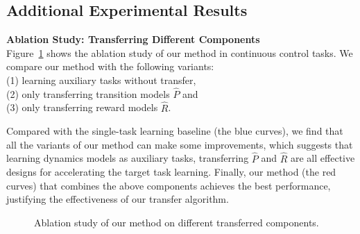 \newpage 
\subsection{Additional Experimental Results}
\label{app:exp_results}

\textbf{Ablation Study: Transferring Different Components}\\
Figure~\ref{fig:mujoco_ablation} shows the ablation study of our method in continuous control tasks. We compare our method with the following variants:\\
(1) learning auxiliary tasks without transfer, \\
(2) only transferring transition models $\hat{P}$ and \\
(3) only transferring reward models $\hat{R}$.

Compared with the single-task learning baseline (the blue curves), we find that all the variants of our method can make some improvements, which suggests that learning dynamics models as auxiliary tasks, transferring $\hat{P}$ and $\hat{R}$ are all effective designs for accelerating the target task learning. Finally, our method (the red curves) that combines the above components achieves the best performance, justifying the effectiveness of our transfer algorithm.


\begin{figure}[!htbp]
\centering
 \begin{subfigure}[t]{0.48\columnwidth}
  \centering
  
 \end{subfigure}
 \hfill
 \hspace{-1em}
 \begin{subfigure}[t]{0.48\columnwidth}
  \centering
   
 \end{subfigure}

 \begin{subfigure}[t]{0.48\columnwidth}
  \centering
   
 \end{subfigure}
 \hfill
 \begin{subfigure}[t]{0.48\columnwidth}
  \centering
   
 \end{subfigure}
 \vspace{-2em}
 \caption{\small{Ablation study of our method on different transferred components.}}
\label{fig:mujoco_ablation}
\end{figure}

